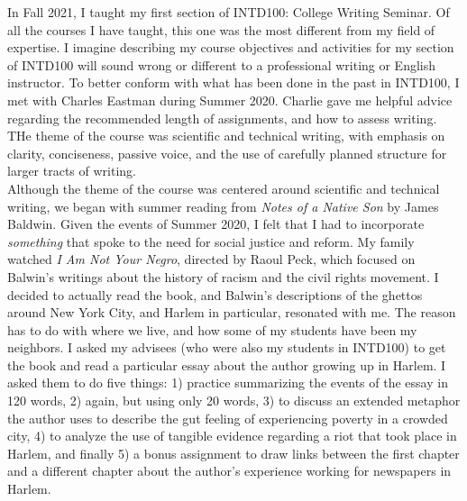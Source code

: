 \documentclass[../../../main.tex]{subfiles}
\begin{document}
In Fall 2021, I taught my first section of INTD100: College Writing Seminar.  Of all the courses I have taught, this one was the most different from my field of expertise.  I imagine describing my course objectives and activities for my section of INTD100 will sound wrong or different to a professional writing or English instructor.  To better conform with what has been done in the past in INTD100, I met with Charles Eastman during Summer 2020.  Charlie gave me helpful advice regarding the recommended length of assignments, and how to assess writing.  THe theme of the course was scientific and technical writing, with emphasis on clarity, conciseness, passive voice, and the use of carefully planned structure for larger tracts of writing.
\\
\vspace{0.25cm}
Although the theme of the course was centered around scientific and technical writing, we began with summer reading from \textit{Notes of a Native Son} by James Baldwin.  Given the events of Summer 2020, I felt that I had to incorporate \textit{something} that spoke to the need for social justice and reform.  My family watched \textit{I Am Not Your Negro}, directed by Raoul Peck, which focused on Balwin's writings about the history of racism and the civil rights movement.  I decided to actually read the book, and Balwin's descriptions of the ghettos around New York City, and Harlem in particular, resonated with me.  The reason has to do with where we live, and how some of my students have been my neighbors.  I asked my advisees (who were also my students in INTD100) to get the book and read a particular essay about the author growing up in Harlem.  I asked them to do five things: 1) practice summarizing the events of the essay in 120 words, 2) again, but using only 20 words, 3) to discuss an extended metaphor the author uses to describe the gut feeling of experiencing poverty in a crowded city, 4) to analyze the use of tangible evidence regarding a riot that took place in Harlem, and finally 5) a bonus assignment to draw links between the first chapter and a different chapter about the author's experience working for newspapers in Harlem.
\\
\vspace{0.25cm}
\end{document}
